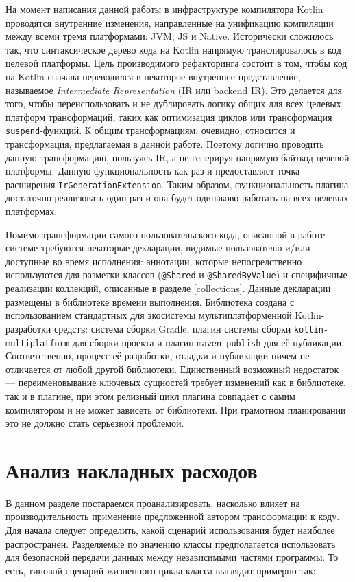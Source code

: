 \documentclass[specification,annotation,times]{itmo-student-thesis}
\begin{document}
На момент написания данной работы в инфраструктуре компилятора Kotlin проводятся внутренние изменения, направленные на унификацию компиляции между всеми тремя платформами: JVM, JS и Native.
Исторически сложилось так, что синтаксическое дерево кода на Kotlin напрямую транслировалось в код целевой платформы.
Цель производимого рефакторинга состоит в том, чтобы код на Kotlin сначала переводился в некоторое внутреннее представление, называемое \textit{Intermediate Representation} (IR или backend IR).
Это делается для того, чтобы переиспользовать и не дублировать логику общих для всех целевых платформ трансформаций, таких как оптимизация циклов или трансформация \texttt{suspend}-функций.
К общим трансформациям, очевидно, относится и трансформация, предлагаемая в данной работе.
Поэтому логично проводить данную трансформацию, пользуясь IR, а не генерируя напрямую байткод целевой платформы.
Данную функциональность как раз и предоставляет точка расширения \texttt{IrGenerationExtension}. Таким образом, функциональность плагина достаточно реализовать один раз и она будет одинаково работать на всех целевых платформах.

Помимо трансформации самого пользовательского кода, описанной в работе системе требуются некоторые декларации, видимые пользователю и/или доступные во время исполнения: аннотации, которые непосредственно используются для разметки классов (\texttt{@Shared} и \texttt{@SharedByValue}) и специфичные реализации коллекций, описанные в разделе \ref{collections}.
Данные декларации размещены в библиотеке времени выполнения. Библиотека создана с использованием стандартных для экосистемы мультиплатформенной Kotlin-разработки средств: система сборки Gradle, плагин системы сборки \texttt{kotlin-multiplatform} для сборки проекта и плагин \texttt{maven-publish} для её публикации.
Соответственно, процесс её разработки, отладки и публикации ничем не отличается от любой другой библиотеки.
Единственный возможный недостаток --- переименовывание ключевых сущностей требует изменений как в библиотеке, так и в плагине, при этом релизный цикл плагина совпадает с самим компилятором и не может зависеть от библиотеки. При грамотном планировании это не должно стать серьезной проблемой.

\section{Анализ накладных расходов}

В данном разделе постараемся проанализировать, насколько влияет на производительность применение предложенной автором трансформации к коду.
Для начала следует определить, какой сценарий использования будет наиболее распространён.
Разделяемые по значению классы предполагается использовать для безопасной передачи данных между независимыми частями программы. То есть, типовой сценарий жизненного цикла класса выглядит примерно так:
\end{document}
